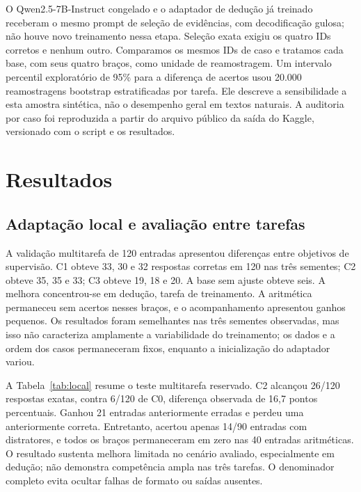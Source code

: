 \documentclass[12pt,a4paper]{article}
\begin{document}
O Qwen2.5-7B-Instruct congelado e o adaptador de dedução já treinado receberam o mesmo prompt de seleção de evidências, com decodificação gulosa; não houve novo treinamento nessa etapa. Seleção exata exigiu os quatro IDs corretos e nenhum outro. Comparamos os mesmos IDs de caso e tratamos cada base, com seus quatro braços, como unidade de reamostragem. Um intervalo percentil exploratório de 95\% para a diferença de acertos usou 20.000 reamostragens bootstrap estratificadas por tarefa. Ele descreve a sensibilidade a esta amostra sintética, não o desempenho geral em textos naturais. A auditoria por caso foi reproduzida a partir do arquivo público da saída do Kaggle, versionado com o script e os resultados.

\section{Resultados}
\subsection{Adaptação local e avaliação entre tarefas}
A validação multitarefa de 120 entradas apresentou diferenças entre objetivos de supervisão. C1 obteve 33, 30 e 32 respostas corretas em 120 nas três sementes; C2 obteve 35, 35 e 33; C3 obteve 19, 18 e 20. A base sem ajuste obteve seis. A melhora concentrou-se em dedução, tarefa de treinamento. A aritmética permaneceu sem acertos nesses braços, e o acompanhamento apresentou ganhos pequenos. Os resultados foram semelhantes nas três sementes observadas, mas isso não caracteriza amplamente a variabilidade do treinamento; os dados e a ordem dos casos permaneceram fixos, enquanto a inicialização do adaptador variou.

A Tabela~\ref{tab:local} resume o teste multitarefa reservado. C2 alcançou 26/120 respostas exatas, contra 6/120 de C0, diferença observada de 16,7 pontos percentuais. Ganhou 21 entradas anteriormente erradas e perdeu uma anteriormente correta. Entretanto, acertou apenas 14/90 entradas com distratores, e todos os braços permaneceram em zero nas 40 entradas aritméticas. O resultado sustenta melhora limitada no cenário avaliado, especialmente em dedução; não demonstra competência ampla nas três tarefas. O denominador completo evita ocultar falhas de formato ou saídas ausentes.
\end{document}
